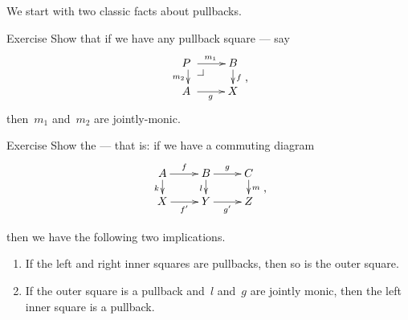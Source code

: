 \documentclass[b]{subfiles}
\begin{document}
\begin{parsec}%
\begin{point}%
    We start with two classic facts about pullbacks.
\end{point}
\begin{point}{Exercise}%
Show that if we have any pullback square --- say
\begin{equation*}
    \vcenter{\vbox{\xymatrix@R-1pc{
        {P\ } \pullback \ar[r]^{m_1} \ar[d]_{m_2}
        & B \ar[d]^f
                \\ {A\ } \ar[r]_{g}
    & X}}} \text{,}
\end{equation*}
then~$m_1$ and~$m_2$ are jointly-monic.
\end{point}

\begin{point}{Exercise}%
Show the  --- that is:
    if we have a commuting diagram
\begin{equation*}
    \vcenter{\vbox{\xymatrix@R-1pc{
                A \ar[r]^f \ar[d]_k
                & B \ar[r]^g \ar[d]_l
                & C \ar[d]^m
                \\ X \ar[r]_{f'}
                & Y \ar[r]_{g'}
                & Z
    }}} \text{,}
\end{equation*}
\end{point}
then we have the following two implications.
\begin{enumerate}
\item
If the left and right inner squares are pullbacks,
    then so is the outer square.
\item
If the outer square is a pullback
    and~$l$ and~$g$ are jointly monic,
    then the left inner square is a pullback.
\end{enumerate}
\end{parsec}
\end{document}
